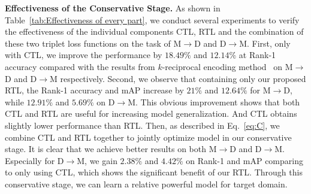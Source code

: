 \documentclass[10pt,twocolumn,letterpaper]{article}
\begin{document}
\textbf{Effectiveness of the Conservative Stage.} As shown in Table~\ref{tab:Effectiveness of every part}, we conduct several experiments to verify the effectiveness of the individual components CTL, RTL and the combination of these two triplet loss functions on the task of M$\rightarrow$D and D$\rightarrow$M. 
First, only with CTL, we improve the performance by $18.49\%$ and $12.14\%$ at Rank-1 accuracy compared with the results from $k$-reciprocal encoding method~\cite{rerank} on M$\rightarrow$D and D$\rightarrow$M respectively. 
Second, we observe that containing only our proposed RTL, the Rank-1 accuracy and mAP increase by $21\%$ and $12.64\%$ for M$\rightarrow$D, while $12.91\%$ and $5.69\%$ on D$\rightarrow$M. This obvious improvement shows that both CTL and RTL are useful for increasing model generalization. And CTL obtains slightly lower performance than RTL.
Then, as described in Eq.~\eqref{eq:C}, we combine CTL and RTL together to jointly optimize model in our conservative stage. It is clear  that we achieve better results on both M$\rightarrow$D and D$\rightarrow$M. Especially for D$\rightarrow$M, we gain $2.38\%$ and $4.42\%$ on Rank-1 and mAP comparing to only using CTL, which shows the significant benefit of our RTL. 
Through this conservative stage, we can learn a relative powerful model for target domain. 
\end{document}
